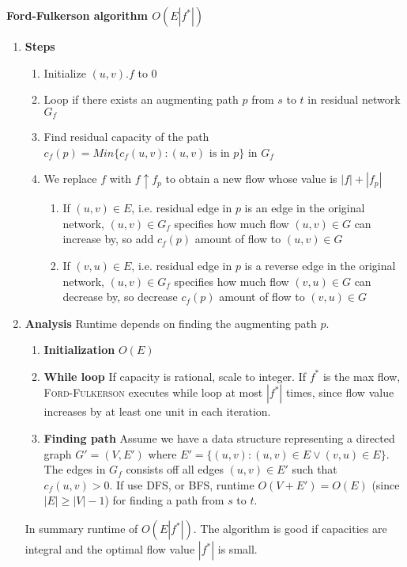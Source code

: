 \documentclass[11pt]{article}
\begin{document}
\begin{defn*}
    \textbf{Ford-Fulkerson algorithm $O(E|f^*|)$}  
    \begin{enumerate}
        \item \textbf{Steps}
        \begin{enumerate}
            \item Initialize $(u,v).f$ to 0
            \item Loop if there exists an augmenting path $p$ from $s$ to $t$ in residual network $G_f$ 
            \item Find residual capacity of the path $c_f(p) = Min\{c_f(u,v): (u,v) \text{ is in } p \}$ in $G_f$
            \item We replace $f$ with $f\uparrow f_p$ to obtain a new flow whose value is $|f| + |f_p|$
            \begin{enumerate}
                \item If $(u,v) \in E$, i.e. residual edge in $p$ is an edge in the original network, $(u,v)\in G_f$ specifies how much flow $(u,v)\in G$ can increase by, so add $c_f(p)$ amount of flow to $(u,v)\in G$
                \item If $(v, u) \in E$, i.e. residual edge in $p$ is a reverse edge in the original network, $(u,v)\in G_f$ specifies how much flow $(v,u) \in G$ can decrease by, so decrease $c_f(p)$ amount of flow to $(v,u)\in G$ 
            \end{enumerate}
        \end{enumerate}
        \item \textbf{Analysis} Runtime depends on finding the augmenting path $p$. 
        \begin{enumerate}
            \item \textbf{Initialization} $O(E)$
            \item \textbf{While loop} If capacity is rational, scale to integer. If $f^*$ is the max flow, \textsc{Ford-Fulkerson} executes while loop at most $|f^*|$ times,  since flow value increases by at least one unit in each iteration.
            \item \textbf{Finding path} Assume we have a data structure representing a directed graph $G' = (V,E')$ where $E' =\{(u,v): (u,v)\in E\lor (v,u)\in E \}$. The edges in $G_f$ consists off all edges $(u,v) \in E'$ such that $c_f(u,v) > 0$. If use DFS, or BFS, runtime $O(V + E') = O(E)$ (since $|E| \geq |V| -1$) for finding a path from $s$ to $t$. 
        \end{enumerate}
        In summary runtime of $O(E|f^*|)$. The algorithm is good if capacities are integral and the optimal flow value $|f^*|$ is small. 
    \end{enumerate}
\end{defn*}
\end{document}
